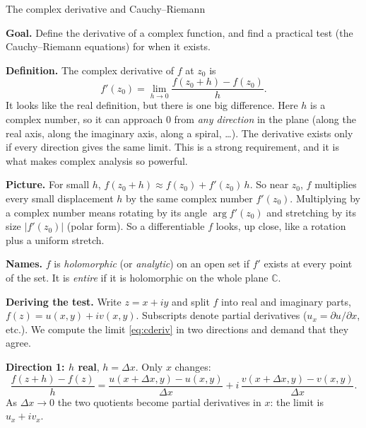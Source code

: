 \documentclass[11pt]{beamer}
\begin{document}
\begin{frame}[allowframebreaks=1.00]{The complex derivative and Cauchy--Riemann}
\footnotesize

\textbf{Goal.} Define the derivative of a complex function, and find a practical test (the
Cauchy--Riemann equations) for when it exists.

\textbf{Definition.} The complex derivative of \(f\) at \(z_0\) is
\begin{equation}
 f'(z_0)=\lim_{h\to0}\frac{f(z_0+h)-f(z_0)}{h}.
 \label{eq:cderiv}
\end{equation}
It looks like the real definition, but there is one big difference. Here \(h\) is a complex
number, so it can approach \(0\) from \emph{any direction} in the plane (along the real axis,
along the imaginary axis, along a spiral, \dots). The derivative exists only if every direction
gives the same limit. This is a strong requirement, and it is what makes complex analysis so
powerful.

\textbf{Picture.} For small \(h\), \(f(z_0+h)\approx f(z_0)+f'(z_0)\,h\). So near \(z_0\), \(f\) multiplies
every small displacement \(h\) by the same complex number \(f'(z_0)\). Multiplying by a complex
number means rotating by its angle \(\arg f'(z_0)\) and stretching by its size \(|f'(z_0)|\) (polar
form). So a differentiable \(f\) looks, up close, like a rotation plus a uniform stretch.

\textbf{Names.} \(f\) is \emph{holomorphic} (or \emph{analytic}) on an open set if \(f'\) exists at
every point of the set. It is \emph{entire} if it is holomorphic on the whole plane \(\mathbb C\).
\par\framebreak\par
\textbf{Deriving the test.} Write \(z=x+iy\) and split \(f\) into real and imaginary parts,
\(f(z)=u(x,y)+iv(x,y)\). Subscripts denote partial derivatives (\(u_x=\partial u/\partial x\),
etc.). We compute the limit \eqref{eq:cderiv} in two directions and demand that they agree.

\textbf{Direction 1: \(h\) real}, \(h=\Delta x\). Only \(x\) changes:
\[
 \frac{f(z+h)-f(z)}{h}
 =\frac{u(x+\Delta x,y)-u(x,y)}{\Delta x}
  +i\,\frac{v(x+\Delta x,y)-v(x,y)}{\Delta x}.
\]
As \(\Delta x\to0\) the two quotients become partial derivatives in \(x\): the limit is
\(u_x+iv_x\).


\end{frame}
\end{document}
